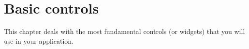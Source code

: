 \chapter{Basic controls}\label{chapbasiccontrols}
%
%
\setfooter{\thepage}{}{}{}{}{\thepage}%

This chapter deals with the most fundamental controls (or widgets) that you will use in your
application.

